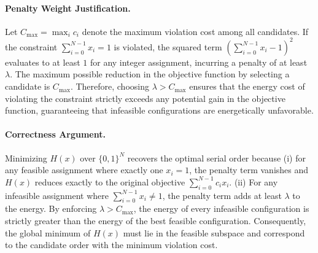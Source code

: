 \documentclass[12pt]{article}
\begin{document}
\paragraph{Penalty Weight Justification.}
Let $C_{\max} = \max_{i} c_i$ denote the maximum violation cost among all candidates. If the constraint $\sum_{i=0}^{N-1} x_i = 1$ is violated, the squared term $\left( \sum_{i=0}^{N-1} x_i - 1 \right)^2$ evaluates to at least $1$ for any integer assignment, incurring a penalty of at least $\lambda$. The maximum possible reduction in the objective function by selecting a candidate is $C_{\max}$. Therefore, choosing $\lambda > C_{\max}$ ensures that the energy cost of violating the constraint strictly exceeds any potential gain in the objective function, guaranteeing that infeasible configurations are energetically unfavorable.

\paragraph{Correctness Argument.}
Minimizing $H(x)$ over $\{0,1\}^N$ recovers the optimal serial order because (i) for any feasible assignment where exactly one $x_i = 1$, the penalty term vanishes and $H(x)$ reduces exactly to the original objective $\sum_{i=0}^{N-1} c_i x_i$. (ii) For any infeasible assignment where $\sum_{i=0}^{N-1} x_i \neq 1$, the penalty term adds at least $\lambda$ to the energy. By enforcing $\lambda > C_{\max}$, the energy of every infeasible configuration is strictly greater than the energy of the best feasible configuration. Consequently, the global minimum of $H(x)$ must lie in the feasible subspace and correspond to the candidate order with the minimum violation cost.
\end{document}

